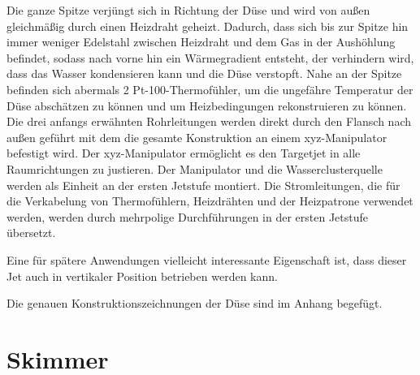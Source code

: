 Die ganze Spitze verjüngt sich in Richtung der Düse und wird von außen gleichmäßig durch einen Heizdraht geheizt. Dadurch, dass sich bis zur Spitze hin immer weniger Edelstahl zwischen Heizdraht und dem Gas in der Aushöhlung befindet, sodass nach vorne hin ein Wärmegradient entsteht, der verhindern wird, dass das Wasser kondensieren kann und die Düse verstopft. Nahe an der Spitze befinden sich abermals 2 Pt-100-Thermofühler, um die ungefähre Temperatur der Düse abschätzen zu können und um Heizbedingungen rekonstruieren zu können. 
%
Die drei anfangs erwähnten Rohrleitungen werden direkt durch den Flansch nach außen geführt mit dem die gesamte Konstruktion an einem xyz-Manipulator befestigt wird. Der xyz-Manipulator ermöglicht es den Targetjet in alle Raumrichtungen zu justieren. Der Manipulator und die Wasserclusterquelle werden als Einheit an der ersten Jetstufe montiert. 
Die Stromleitungen, die für die Verkabelung von Thermofühlern, Heizdrähten und der Heizpatrone verwendet werden, werden durch mehrpolige Durchführungen in der ersten Jetstufe übersetzt. 



Eine für spätere Anwendungen vielleicht interessante Eigenschaft ist, dass dieser Jet auch in vertikaler Position betrieben werden kann.

Die genauen Konstruktionszeichnungen der Düse sind im Anhang begefügt.
%
%



\section{Skimmer} \label{sec:Skimmer}


